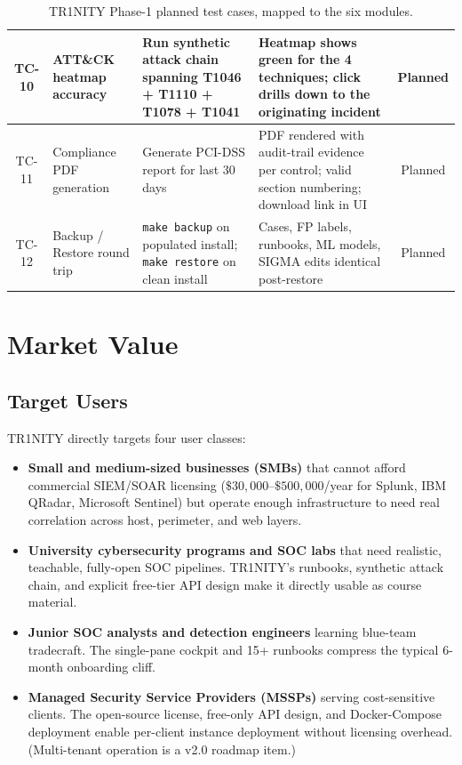 \documentclass[11pt,a4paper]{article}
\begin{document}
\begin{table}[H]
\begin{tabularx}{\textwidth}{|>{}c|L{2.6cm}|L{3.4cm}|L{5.2cm}|c|}
\hline
TC-10 & ATT\&CK heatmap accuracy & Run synthetic attack chain spanning T1046 + T1110 + T1078 + T1041 & Heatmap shows green for the 4 techniques; click drills down to the originating incident & Planned \\
\hline
TC-11 & Compliance PDF generation & Generate PCI-DSS report for last 30 days & PDF rendered with audit-trail evidence per control; valid section numbering; download link in UI & Planned \\
\hline
TC-12 & Backup / Restore round trip & \texttt{make backup} on populated install; \texttt{make restore} on clean install & Cases, FP labels, runbooks, ML models, SIGMA edits identical post-restore & Planned \\
\hline
\end{tabularx}
\caption{TR1NITY Phase-1 planned test cases, mapped to the six modules.}
\end{table}

\newpage
\section{Market Value}
\label{sec:market}

\subsection{Target Users}
TR1NITY directly targets four user classes:

\begin{itemize}[leftmargin=*, itemsep=2pt]
  \item \textbf{Small and medium-sized businesses (SMBs)} that cannot afford commercial SIEM/SOAR licensing ($\$30{,}000$--$\$500{,}000$/year for Splunk, IBM QRadar, Microsoft Sentinel) but operate enough infrastructure to need real correlation across host, perimeter, and web layers.
  \item \textbf{University cybersecurity programs and SOC labs} that need realistic, teachable, fully-open SOC pipelines. TR1NITY's runbooks, synthetic attack chain, and explicit free-tier API design make it directly usable as course material.
  \item \textbf{Junior SOC analysts and detection engineers} learning blue-team tradecraft. The single-pane cockpit and 15+ runbooks compress the typical 6-month onboarding cliff.
  \item \textbf{Managed Security Service Providers (MSSPs)} serving cost-sensitive clients. The open-source license, free-only API design, and Docker-Compose deployment enable per-client instance deployment without licensing overhead. (Multi-tenant operation is a v2.0 roadmap item.)
\end{itemize}
\end{document}
